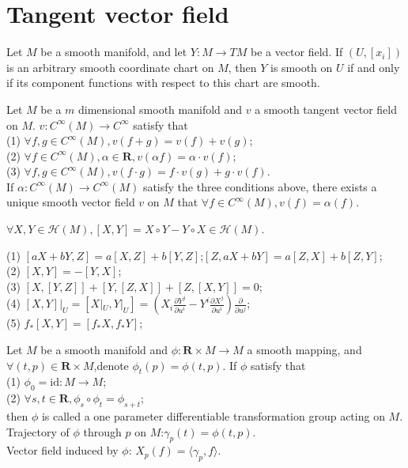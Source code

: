 \section{Tangent vector field}
\begin{newthem}
Let $M$ be a smooth manifold, and let $Y:M \to TM$ be a vector field. If $(U, [x_i])$ is an arbitrary smooth coordinate chart on $M$, then $Y$ is smooth on $U$ if and only if its component functions with respect to this chart are smooth.
\end{newthem}

\begin{newthem}
Let $M$ be a $m$ dimensional smooth manifold and $v$ a smooth tangent vector field on $M$. $v:C^{\infty}(M) \to C^{\infty}$ satisfy that\\
(1) $\forall f,g \in C^{\infty}(M),v(f+g)=v(f)+v(g)$;\\
(2) $\forall f \in C^{\infty}(M),\alpha \in \bm{R},v(\alpha f)=\alpha \cdot v(f)$;\\
(3) $\forall f,g \in C^{\infty}(M),v(f\cdot g) = f \cdot v(g) + g \cdot v(f)$.\\
If $\alpha:C^{\infty}(M) \to C^{\infty}(M)$ satisfy the three conditions above, there exists a unique smooth vector field $v$ on $M$ that $\forall f \in C^{\infty}(M),v(f)=\alpha(f)$.
\end{newthem}

\begin{newthem}
$\forall X,Y \in \mathcal{H}(M),[X,Y]=X \circ Y -Y \circ X \in \mathcal{H}(M)$.
\end{newthem}

\begin{newprop}
(1) $[aX+bY,Z]=a[X,Z]+b[Y,Z]$;$[Z,aX+bY]=a[Z,X]+b[Z,Y]$;\\
(2) $[X,Y]=-[Y,X]$;\\
(3) $[X,[Y,Z]] + [Y,[Z,X]] +[Z,[X,Y]]=0$;\\
(4) $[X,Y]|_{U} = [X|_{U},Y|_{U}] = (X_i \frac{\partial Y^j}{\partial u^i} - Y^i \frac{\partial X^j}{\partial u^i}) \frac{\partial}{\partial u^j}$;\\
(5) $f_{*}[X,Y] = [f_{*}X,f_{*}Y]$;
\end{newprop}

\begin{newdef}
Let $M$ be a smooth manifold and $\phi:\bm{R} \times M \to M$ a smooth mapping, and $\forall (t,p) \in \bm{R} \times M$,denote $\phi_{t}(p) = \phi(t,p)$. If $\phi$ satisfy that\\
(1) $\phi_0 = \mathrm{id}:M \to M$;\\
(2) $\forall s,t \in \bm{R}, \phi_s \circ \phi_t = \phi_{s+t}$;\\
then $\phi$ is called a one parameter differentiable transformation group acting on $M$.\\
Trajectory of $\phi$ through $p$ on $M$:$\gamma_p(t) = \phi(t,p)$.\\
Vector field induced by $\phi$: $X_p(f) = \langle \gamma_p , f \rangle$.
\end{newdef}

